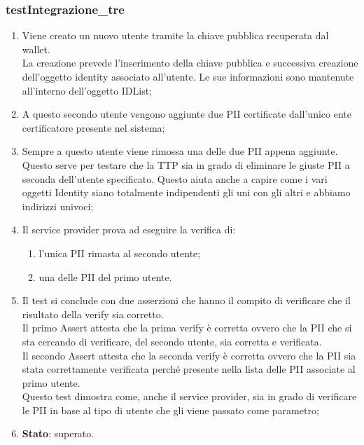 \subsubsection{testIntegrazione\_tre}
\begin{enumerate}
	\item Viene creato un nuovo utente tramite la chiave pubblica recuperata dal wallet.\\
	La creazione prevede l'inserimento della chiave pubblica e successiva creazione dell'oggetto identity associato all'utente. Le sue informazioni sono mantenute all'interno dell'oggetto IDList;	
	\item A questo secondo utente vengono aggiunte due \gls{PII} certificate dall'unico ente certificatore presente nel sistema;
	\item Sempre a questo utente viene rimossa una delle due \gls{PII} appena aggiunte. Questo serve per testare che la \gls{TTP} sia in grado di eliminare le giuste \gls{PII} a seconda dell'utente specificato. Questo aiuta anche a capire come i vari oggetti Identity siano totalmente indipendenti gli uni con gli altri e abbiamo indirizzi univoci; 
	\item Il service provider prova ad eseguire la verifica di:
	\begin{enumerate}
		\item l'unica \gls{PII} rimasta al secondo utente;
		\item una delle \gls{PII} del primo utente.
	\end{enumerate}
	\item Il test si conclude con due asserzioni che hanno il compito di verificare che il risultato della verify sia corretto.\\
	Il primo Assert attesta che la prima verify è corretta ovvero che la \gls{PII} che si sta cercando di verificare, del secondo utente, sia corretta e verificata.\\
	Il secondo Assert attesta che la seconda verify è corretta ovvero che la \gls{PII} sia stata correttamente verificata perché presente nella lista delle \gls{PII} associate al primo utente.\\
	Questo test dimostra come, anche il service provider, sia in grado di verificare le \gls{PII} in base al tipo di utente che gli viene passato come parametro;
	\item \textbf{Stato}: superato.
\end{enumerate}
